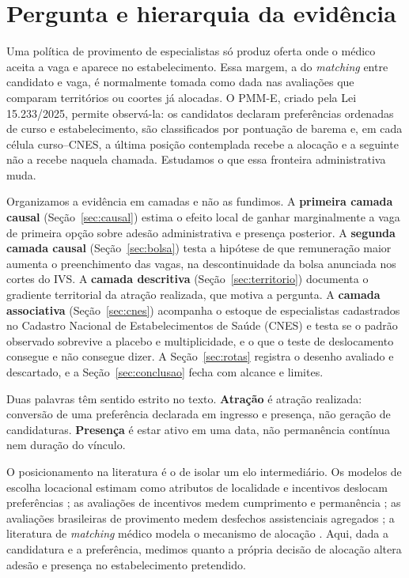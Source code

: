\documentclass[11pt,a4paper]{article}
\begin{document}
\section{Pergunta e hierarquia da evidência}
\label{sec:intro}

Uma política de provimento de especialistas só produz oferta onde o médico
aceita a vaga e aparece no estabelecimento. Essa margem, a do \emph{matching}
entre candidato e vaga, é normalmente tomada como dada nas avaliações que
comparam territórios ou coortes já alocadas. O PMM-E, criado pela Lei
15.233/2025, permite observá-la: os candidatos declaram preferências ordenadas
de curso e estabelecimento, são classificados por pontuação de barema e, em
cada célula curso--CNES, a última posição contemplada recebe a alocação e a
seguinte não a recebe naquela chamada. Estudamos o que essa fronteira
administrativa muda.

Organizamos a evidência em camadas e não as fundimos. A \textbf{primeira camada
causal} (Seção~\ref{sec:causal}) estima o efeito local de ganhar marginalmente
a vaga de primeira opção sobre adesão administrativa e presença posterior. A
\textbf{segunda camada causal} (Seção~\ref{sec:bolsa}) testa a hipótese de que
remuneração maior aumenta o preenchimento das vagas, na descontinuidade da
bolsa anunciada nos cortes do IVS. A
\textbf{camada descritiva} (Seção~\ref{sec:territorio}) documenta o gradiente
territorial da atração realizada, que motiva a pergunta. A \textbf{camada
associativa} (Seção~\ref{sec:cnes}) acompanha o estoque de especialistas
cadastrados no Cadastro Nacional de Estabelecimentos de Saúde (CNES) e testa se
o padrão observado sobrevive a placebo e multiplicidade, e o que o teste de
deslocamento consegue e não consegue dizer. A
Seção~\ref{sec:rotas} registra o desenho avaliado e descartado, e a
Seção~\ref{sec:conclusao} fecha com alcance e limites.

Duas palavras têm sentido estrito no texto. \textbf{Atração} é atração
realizada: conversão de uma preferência declarada em ingresso e presença, não
geração de candidaturas. \textbf{Presença} é estar ativo em uma data, não
permanência contínua nem duração do vínculo.

O posicionamento na literatura é o de isolar um elo intermediário. Os modelos
de escolha locacional estimam como atributos de localidade e incentivos deslocam
preferências \citep{costa2024,sivey2012}; as avaliações de incentivos medem
cumprimento e permanência \citep{barnighausen2009,gravelle2018}; as avaliações
brasileiras de provimento medem desfechos assistenciais agregados
\citep{fontes2018,carrillo2019,sliwa2024}; a literatura de \emph{matching}
médico modela o mecanismo de alocação \citep{roth1984,agarwal2015}. Aqui,
dada a candidatura e a preferência, medimos quanto a própria decisão de
alocação altera adesão e presença no estabelecimento pretendido.
\end{document}
